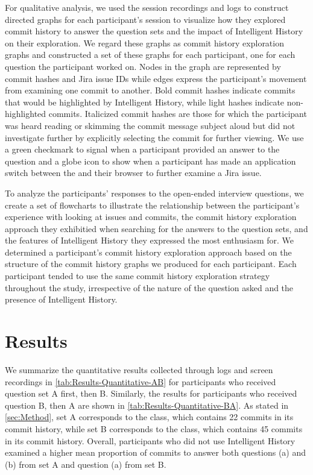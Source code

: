 For qualitative analysis, we used the session recordings and logs to construct directed graphs for each participant's session to visualize how they explored commit history to answer the question sets and the impact of Intelligent History on their exploration.
We regard these graphs as commit history exploration graphs and constructed a set of these graphs for each participant, one for each question the participant worked on.
Nodes in the graph are represented by commit hashes and Jira issue IDs while edges express the participant's movement from examining one commit to another.
Bold commit hashes indicate commits that would be highlighted by Intelligent History, while light hashes indicate non-highlighted commits.
Italicized commit hashes are those for which the participant was heard reading or skimming the commit message subject aloud but did not investigate further by explicitly selecting the commit for further viewing.
We use a green checkmark to signal when a participant provided an answer to the question and a globe icon to show when a participant has made an application switch between the  and their browser to further examine a Jira issue.

To analyze the participants' responses to the open-ended interview questions, we create a set of flowcharts to illustrate the relationship between the participant's experience with looking at issues and commits,
the commit history exploration approach they exhibitied when searching for the answers to the question sets, and the features of Intelligent History they expressed the most enthusiasm for.
We determined a participant's commit history exploration approach based on the structure of the commit history graphs we produced for each participant.
Each participant tended to use the same commit history exploration strategy throughout the study, irrespective of the nature of the question asked and the presence of Intelligent History.

\section{Results}
\label{sec:Results}

We summarize the quantitative results collected through logs and screen recordings in \autoref{tab:Results-Quantitative-AB} for participants who received question set A first, then B.
Similarly, the results for participants who received question B, then A are shown in \autoref{tab:Results-Quantitative-BA}.
As stated in \autoref{sec:Method}, set A corresponds to the  class, which contains 22 commits in its commit history, 
while set B corresponds to the  class, which contains 45 commits in its commit history.
Overall, participants who did not use Intelligent History examined a higher mean proportion of commits to answer both questions (a) and (b) from set A and question (a) from set B.

